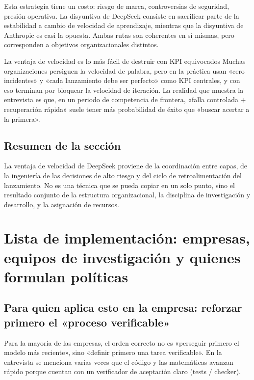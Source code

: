 \documentclass[a4paper]{article}
\begin{document}
Esta estrategia tiene un costo: riesgo de marca, controversias de seguridad, presión operativa. La disyuntiva de DeepSeek consiste en sacrificar parte de la estabilidad a cambio de velocidad de aprendizaje, mientras que la disyuntiva de Anthropic es casi la opuesta. Ambas rutas son coherentes en sí mismas, pero corresponden a objetivos organizacionales distintos.

\begin{warningbox}{La ventaja de velocidad es lo más fácil de destruir con KPI equivocados}
Muchas organizaciones persiguen la velocidad de palabra, pero en la práctica usan «cero incidentes» y «cada lanzamiento debe ser perfecto» como KPI centrales, y con eso terminan por bloquear la velocidad de iteración. La realidad que muestra la entrevista es que, en un periodo de competencia de frontera, «falla controlada + recuperación rápida» suele tener más probabilidad de éxito que «buscar acertar a la primera».
\end{warningbox}

\subsection{Resumen de la sección}

La ventaja de velocidad de DeepSeek proviene de la coordinación entre capas, de la ingeniería de las decisiones de alto riesgo y del ciclo de retroalimentación del lanzamiento. No es una técnica que se pueda copiar en un solo punto, sino el resultado conjunto de la estructura organizacional, la disciplina de investigación y desarrollo, y la asignación de recursos.
\section{Lista de implementación: empresas, equipos de investigación y quienes formulan políticas}

\subsection{Para quien aplica esto en la empresa: reforzar primero el «proceso verificable»}

Para la mayoría de las empresas, el orden correcto no es «perseguir primero el modelo más reciente», sino «definir primero una tarea verificable». En la entrevista se menciona varias veces que el código y las matemáticas avanzan rápido porque cuentan con un verificador de aceptación claro (tests / checker).
\end{document}
